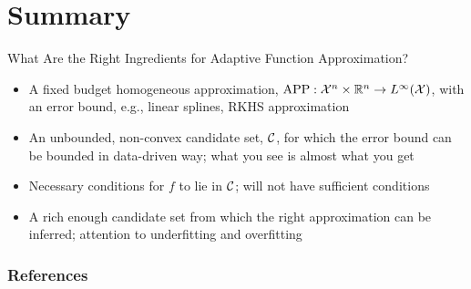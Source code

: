 \documentclass[10pt,compress,xcolor={usenames,dvipsnames},aspectratio=169]{beamer}
\DeclareMathOperator{\app}{APP}
\begin{document}
\section{Summary}

\vspace{-6ex}

\begin{frame}
	{What Are the Right Ingredients for Adaptive Function Approximation?}
	
	\begin{itemize}
		\item A fixed budget \alert{homogeneous approximation}, $\app : \cx^n \times \reals^n \to L^{\infty}(\cx)$, with an error bound, e.g., linear splines, RKHS approximation
		
		\item An unbounded, non-convex \alert{candidate set}, $\mathcal{C}$, for which the error bound can be bounded in \alert{data-driven} way; what you see is almost what you get
		
		\item \alert{Necessary} conditions for $f$ to lie in $\mathcal{C}$; will not have sufficient conditions
		
		\item A rich enough candidate set from which the right approximation can be \alert{inferred}; attention to underfitting and overfitting
		
			
	\end{itemize}




\end{frame}





\thankyouframe


\begin{frame}
	\frametitle{References}
\printbibliography
\end{frame}
\end{document}
